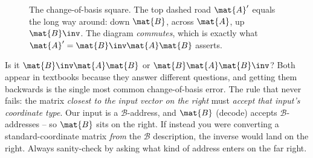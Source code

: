 \begin{figure}[H]
\centering
{}
\caption{The change-of-basis square. The top dashed road
$\mat{A}'$ equals the long way around: down $\mat{B}$, across $\mat{A}$, up
$\mat{B}\inv$. The diagram \emph{commutes}, which is exactly what
$\mat{A}'=\mat{B}\inv\mat{A}\mat{B}$ asserts.}
\label{ch31:fig-commute}
\end{figure}

\begin{trapbox}
Is it $\mat{B}\inv\mat{A}\mat{B}$ or $\mat{B}\mat{A}\mat{B}\inv$? Both appear in
textbooks because they answer different questions, and getting them backwards is
the single most common change-of-basis error. The rule that never fails: the
matrix \emph{closest to the input vector on the right} must \emph{accept that
input's coordinate type}. Our input is a $\mathcal{B}$-address, and $\mat{B}$
(decode) accepts $\mathcal{B}$-addresses -- so $\mat{B}$ sits on the right. If
instead you were converting a standard-coordinate matrix \emph{from} the
$\mathcal{B}$ description, the inverse would land on the right. Always sanity-check
by asking what kind of address enters on the far right.
\end{trapbox}

